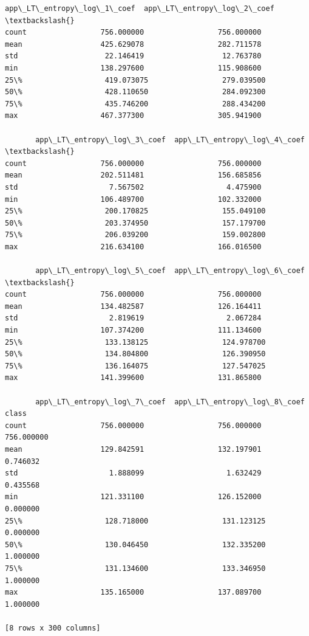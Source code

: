 \documentclass[11pt]{article}
\begin{document}
\begin{tcolorbox}[breakable, size=fbox, boxrule=.5pt, pad at break*=1mm, opacityfill=0]
\begin{Verbatim}[commandchars=\\\{\}]
       app\_LT\_entropy\_log\_1\_coef  app\_LT\_entropy\_log\_2\_coef  \textbackslash{}
count                 756.000000                 756.000000
mean                  425.629078                 282.711578
std                    22.146419                  12.763780
min                   138.297600                 115.908600
25\%                   419.073075                 279.039500
50\%                   428.110650                 284.092300
75\%                   435.746200                 288.434200
max                   467.377300                 305.941900

       app\_LT\_entropy\_log\_3\_coef  app\_LT\_entropy\_log\_4\_coef  \textbackslash{}
count                 756.000000                 756.000000
mean                  202.511481                 156.685856
std                     7.567502                   4.475900
min                   106.489700                 102.332000
25\%                   200.170825                 155.049100
50\%                   203.374950                 157.179700
75\%                   206.039200                 159.002800
max                   216.634100                 166.016500

       app\_LT\_entropy\_log\_5\_coef  app\_LT\_entropy\_log\_6\_coef  \textbackslash{}
count                 756.000000                 756.000000
mean                  134.482587                 126.164411
std                     2.819619                   2.067284
min                   107.374200                 111.134600
25\%                   133.138125                 124.978700
50\%                   134.804800                 126.390950
75\%                   136.164075                 127.547025
max                   141.399600                 131.865800

       app\_LT\_entropy\_log\_7\_coef  app\_LT\_entropy\_log\_8\_coef       class
count                 756.000000                 756.000000  756.000000
mean                  129.842591                 132.197901    0.746032
std                     1.888099                   1.632429    0.435568
min                   121.331100                 126.152000    0.000000
25\%                   128.718000                 131.123125    0.000000
50\%                   130.046450                 132.335200    1.000000
75\%                   131.134600                 133.346950    1.000000
max                   135.165000                 137.089700    1.000000

[8 rows x 300 columns]
\end{Verbatim}
\end{tcolorbox}
        
\end{document}
